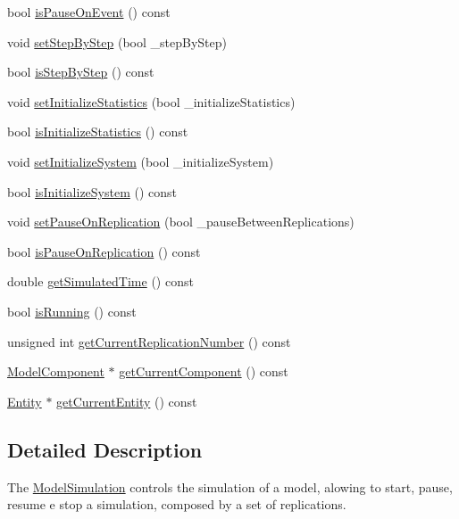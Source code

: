 \begin{DoxyCompactItemize}
\item 
bool \hyperlink{class_model_simulation_a8874f4dfce1800cdce2e9ee68193f1c2}{is\+Pause\+On\+Event} () const 
\item 
void \hyperlink{class_model_simulation_a20102be83bb5d73e0ba56896e7df8e4e}{set\+Step\+By\+Step} (bool \+\_\+step\+By\+Step)
\item 
bool \hyperlink{class_model_simulation_af50016a6b4a066cca6194c0c0a3349e7}{is\+Step\+By\+Step} () const 
\item 
void \hyperlink{class_model_simulation_a990e022cf5d9a07a1467282e7999dafb}{set\+Initialize\+Statistics} (bool \+\_\+initialize\+Statistics)
\item 
bool \hyperlink{class_model_simulation_aa4d1e58ddc7f34a6c414b72581424fea}{is\+Initialize\+Statistics} () const 
\item 
void \hyperlink{class_model_simulation_a6aff149fae4ec9be0d98772e263e9508}{set\+Initialize\+System} (bool \+\_\+initialize\+System)
\item 
bool \hyperlink{class_model_simulation_a7ad0ce011b011a12cab4e08ca9a4bb28}{is\+Initialize\+System} () const 
\item 
void \hyperlink{class_model_simulation_ad41d1cfb0e7d4fcafb8bdbdb7f4de516}{set\+Pause\+On\+Replication} (bool \+\_\+pause\+Between\+Replications)
\item 
bool \hyperlink{class_model_simulation_a96696912f5c1098843f2fe991c69136e}{is\+Pause\+On\+Replication} () const 
\item 
double \hyperlink{class_model_simulation_abd147072d362838f89d0b37e7bf16024}{get\+Simulated\+Time} () const 
\item 
bool \hyperlink{class_model_simulation_a1cf94d6c99daef9c8de567fb29c3d7fb}{is\+Running} () const 
\item 
unsigned int \hyperlink{class_model_simulation_ac0ebd4f2076307f171489baf5557e9c2}{get\+Current\+Replication\+Number} () const 
\item 
\hyperlink{class_model_component}{Model\+Component} $\ast$ \hyperlink{class_model_simulation_a84c5dc03c1869181f6cfff2f3ce7fce2}{get\+Current\+Component} () const 
\item 
\hyperlink{class_entity}{Entity} $\ast$ \hyperlink{class_model_simulation_a1b6f4ef7c6eccef2fc4ce4db2889a7c4}{get\+Current\+Entity} () const 
\end{DoxyCompactItemize}


\subsection{Detailed Description}
The \hyperlink{class_model_simulation}{Model\+Simulation} controls the simulation of a model, alowing to start, pause, resume e stop a simulation, composed by a set of replications. 


